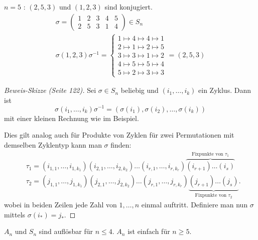 \begin{eg}
	$n=5$ : $(2,5,3)$ und $(1,2,3)$ sind konjugiert.
	\begin{gather*}
		\sigma = \begin{pmatrix} 
			1 & 2 & 3 & 4 & 5\\
			2 & 5 & 3 & 1 & 4
		\end{pmatrix} \in S_{n}\\ 
		\sigma (1,2,3) \sigma^{-1} = \begin{cases}
			1 \mapsto  4 \mapsto 4 \mapsto 1\\
			2 \mapsto 1 \mapsto 2 \mapsto 5\\
			3 \mapsto 3 \mapsto 1 \mapsto 2\\
			4 \mapsto 5 \mapsto 5 \mapsto 4\\
			5 \mapsto 2 \mapsto 3 \mapsto 3
		\end{cases} = (2,5,3)
	\end{gather*}
\end{eg}

\begin{proof}[Beweis-Skizze (Seite 122)]
	Sei $\sigma \in S_{n}$ beliebig und $(i_1,\ldots,i_{k})$ ein Zyklus.
	Dann ist 
	\[
		\sigma(i_1,\ldots,i_{k}) \sigma^{-1} = (\sigma(i_1),\sigma(i_2),\ldots,\sigma(i_{k}))
	\]
	mit einer kleinen Rechnung wie im Beispiel.
	
	Dies gilt analog auch für Produkte von Zyklen für zwei Permutationen mit demselben Zyklentyp kann man $\sigma$ finden:
	\begin{align*}
		&\tau_{1} = (i_{1,1},\ldots,i_{1,k_1})(i_{2,1},\ldots,i_{2,k_2})\ldots (i_{r,1},\ldots,i_{r,k_{r}}) \overbrace{(i_{r+1}) \ldots (i_{s})}^{\text{Fixpunkte von } \tau_1}\\
		&\tau_{2} = (j_{1,1},\ldots,j_{1,k_1})(j_{2,1},\ldots,j_{2,k_2})\ldots (j_{r,1},\ldots,j_{r,k_{r}}) \underbrace{(j_{r+1}) \ldots (j_{s})}_{\text{Fixpunkte von } \tau_2}
	.\end{align*}
	wobei in beiden Zeilen jede Zahl von $1,\ldots,n$ einmal auftritt.
	Definiere man nun $\sigma$ mittels $\sigma(i_{*}) = j_{*}$.
\end{proof}

\begin{theorem}
	$A_{n}$ und $S_{n}$ sind auflösbar für $n \leq 4$.
	$A_{n}$ ist einfach für $n \geq 5$.
\end{theorem}

